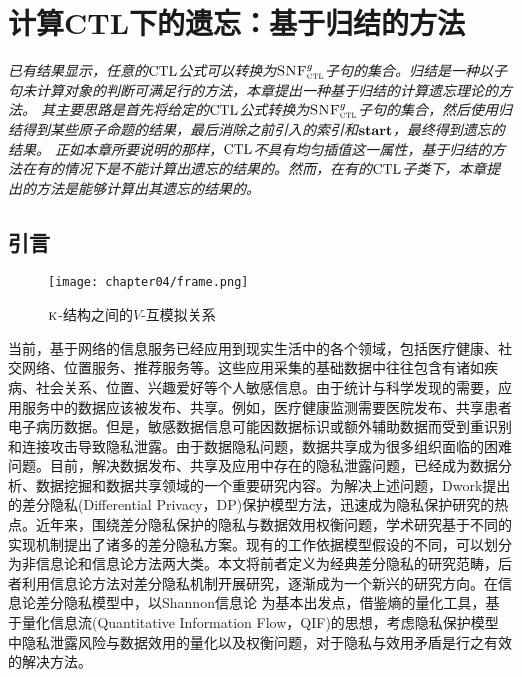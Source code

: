 \chapter{计算CTL下的遗忘：基于归结的方法}\label{chapter04}
{\em 
已有结果显示，任意的$\textrm{CTL}$公式可以转换为${\textsc{SNF}_{\textsc{ctl}}^g}$子句的集合。归结是一种以子句未计算对象的判断可满足行的方法，本章提出一种基于归结的计算遗忘理论的方法。
其主要思路是首先将给定的$\textrm{CTL}$公式转换为${\textsc{SNF}_{\textsc{ctl}}^g}$子句的集合，然后使用归结得到某些原子命题的结果，最后消除之前引入的索引和$\textbf{start}$，最终得到遗忘的结果。
正如本章所要说明的那样，$\textrm{CTL}$不具有均匀插值这一属性，基于归结的方法在有的情况下是不能计算出遗忘的结果的。然而，在有的$\textrm{CTL}$子类下，本章提出的方法是能够计算出其遗忘的结果的。}

\section{引言}
\begin{figure*}[!htb]
	\centering
	\texttt{[image: chapter04/frame.png]}\\
	\caption{$\textsc{k}$-结构之间的$V$-互模拟关系}
	\label{Fig:chapter05:v1uv2}
\end{figure*}
当前，基于网络的信息服务已经应用到现实生活中的各个领域，包括医疗健康、社交网络、位置服务、推荐服务等。这些应用采集的基础数据中往往包含有诸如疾病、社会关系、位置、兴趣爱好等个人敏感信息。由于统计与科学发现的需要，应用服务中的数据应该被发布、共享。例如，医疗健康监测需要医院发布、共享患者电子病历数据。但是，敏感数据信息可能因数据标识或额外辅助数据而受到重识别和连接攻击导致隐私泄露\cite{sweeney2002k}。由于数据隐私问题，数据共享成为很多组织面临的困难问题。目前，解决数据发布、共享及应用中存在的隐私泄露问题，已经成为数据分析、数据挖掘和数据共享领域的一个重要研究内容。为解决上述问题，Dwork提出的差分隐私\cite{dwork2006differential,dwork2006calibrating,dwork2008differential,dwork2014algorithmic,dwork2015the}(Differential Privacy，DP)保护模型方法，迅速成为隐私保护研究的热点\cite{zhu2017differentially,zhangxiaojian2014,zhu2017differentially}。近年来，围绕差分隐私保护的隐私与数据效用权衡问题，学术研究基于不同的实现机制\cite{mcsherry2007mechanism,dwork2008differential,ghosh2012universally}提出了诸多的差分隐私方案。现有的工作依据模型假设的不同\cite{sarwate2014a}，可以划分为非信息论和信息论方法两大类。本文将前者定义为经典差分隐私的研究范畴，后者利用信息论方法对差分隐私机制开展研究，逐渐成为一个新兴的研究方向。在信息论差分隐私模型中，以Shannon信息论\cite{shannon1948a} 为基本出发点，借鉴熵的量化工具，基于量化信息流\cite{smith2009on,alvim2011on,boreale2015quantitative,alvim2015on}(Quantitative Information Flow，QIF)的思想，考虑隐私保护模型中隐私泄露风险与数据效用的量化以及权衡问题，对于隐私与效用矛盾是行之有效的解决方法。


